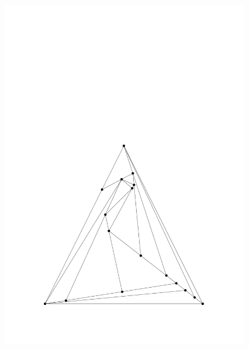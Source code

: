 \begin{figure}
\begin{minipage}{0.48\textwidth}
    \includegraphics[width=0.95\textwidth]{vis_17_1.pdf}
  \end{minipage}
  \hfill
  \begin{minipage}{0.48\textwidth}
 \centering

\end{minipage}
\end{figure}
